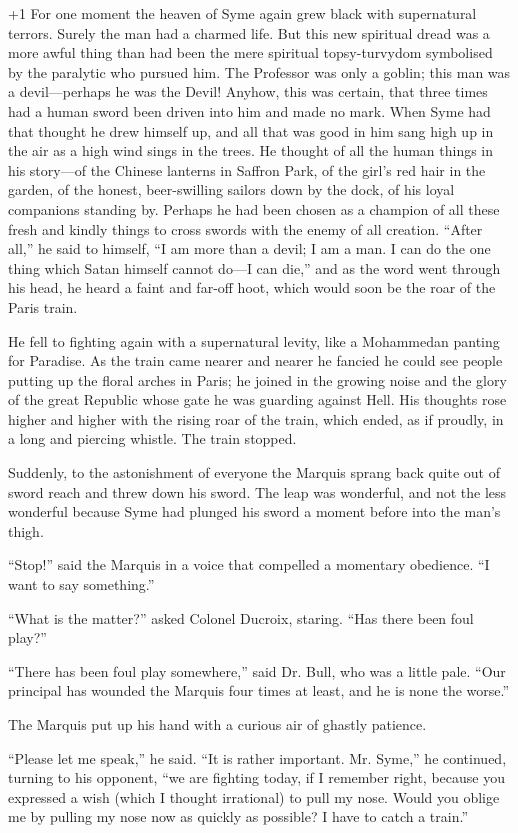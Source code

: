 \looseness+1
For one moment the heaven of Syme again grew black with supernatural terrors. Surely the man had a charmed life. But this new spiritual dread was a more awful thing than had been the mere spiritual topsy-turvydom symbolised by the paralytic who pursued him. The Professor was only a goblin; this man was a devil⁠—perhaps he was the Devil! Anyhow, this was certain, that three times had a human sword been driven into him and made no mark. When Syme had that thought he drew himself up, and all that was good in him sang high up in the air as a high wind sings in the trees. He thought of all the human things in his story⁠—of the Chinese lanterns in Saffron Park, of the girl’s red hair in the garden, of the honest, beer-swilling sailors down by the dock, of his loyal companions standing by. Perhaps he had been chosen as a champion of all these fresh and kindly things to cross swords with the enemy of all creation. “After all,” he said to himself, “I am more than a devil; I am a man. I can do the one thing which Satan himself cannot do⁠—I can die,” and as the word went through his head, he heard a faint and far-off hoot, which would soon be the roar of the Paris train.

He fell to fighting again with a supernatural levity, like a Mohammedan panting for Paradise. As the train came nearer and nearer he fancied he could see people putting up the floral arches in Paris; he joined in the growing noise and the glory of the great Republic whose gate he was guarding against Hell. His thoughts rose higher and higher with the rising roar of the train, which ended, as if proudly, in a long and piercing whistle. The train stopped.

Suddenly, to the astonishment of everyone the Marquis sprang back quite out of sword reach and threw down his sword. The leap was wonderful, and not the less wonderful because Syme had plunged his sword a moment before into the man’s thigh.

“Stop!” said the Marquis in a voice that compelled a momentary obedience. “I want to say something.”

“What is the matter?” asked Colonel Ducroix, staring. “Has there been foul play?”

“There has been foul play somewhere,” said Dr. Bull, who was a little pale. “Our principal has wounded the Marquis four times at least, and he is none the worse.”

The Marquis put up his hand with a curious air of ghastly patience.

“Please let me speak,” he said. “It is rather important. Mr. Syme,” he continued, turning to his opponent, “we are fighting today, if I remember right, because you expressed a wish (which I thought irrational) to pull my nose. Would you oblige me by pulling my nose now as quickly as possible? I have to catch a train.”

